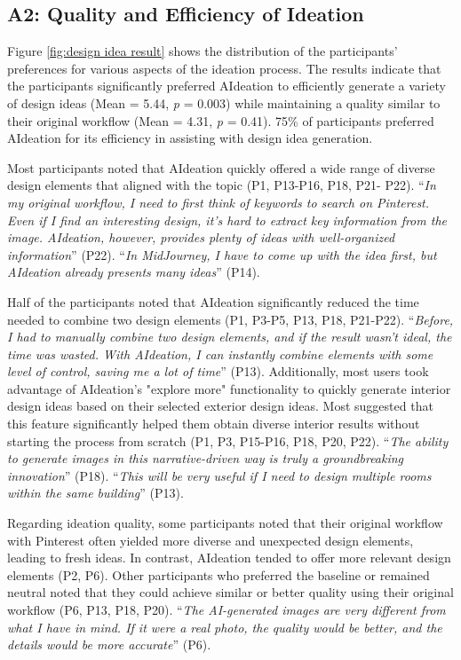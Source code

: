 \subsection{A2: Quality and Efficiency of Ideation}
Figure \ref{fig:design idea result} shows the distribution of the participants' preferences for various aspects of the ideation process. The results indicate that the participants significantly preferred AIdeation to efficiently generate a variety of design ideas (Mean = 5.44, \textit{p} = 0.003) while maintaining a quality similar to their original workflow (Mean = 4.31, \textit{p} = 0.41). 75\% of participants preferred AIdeation for its efficiency in assisting with design idea generation. 

Most participants noted that AIdeation quickly offered a wide range of diverse design elements that aligned with the topic (P1, P13-P16, P18, P21- P22). “\textit{In my original workflow, I need to first think of keywords to search on Pinterest. Even if I find an interesting design, it's hard to extract key information from the image. AIdeation, however, provides plenty of ideas with well-organized information}” (P22). “\textit{In MidJourney, I have to come up with the idea first, but AIdeation already presents many ideas}” (P14).

Half of the participants noted that AIdeation significantly reduced the time needed to combine two design elements (P1, P3-P5, P13, P18, P21-P22). “\textit{Before, I had to manually combine two design elements, and if the result wasn’t ideal, the time was wasted. With AIdeation, I can instantly combine elements with some level of control, saving me a lot of time}” (P13).
Additionally, most users took advantage of AIdeation's "explore more" functionality to quickly generate interior design ideas based on their selected exterior design ideas. Most suggested that this feature significantly helped them obtain diverse interior results without starting the process from scratch (P1, P3, P15-P16, P18, P20, P22). “\textit{The ability to generate images in this narrative-driven way is truly a groundbreaking innovation}” (P18).  “\textit{This will be very useful if I need to design multiple rooms within the same building}” (P13).

Regarding ideation quality, some participants noted that their original workflow with Pinterest often yielded more diverse and unexpected design elements, leading to fresh ideas. In contrast, AIdeation tended to offer more relevant design elements (P2, P6). Other participants who preferred the baseline or remained neutral noted that they could achieve similar or better quality using their original workflow (P6, P13, P18, P20). “\textit{The AI-generated images are very different from what I have in mind. If it were a real photo, the quality would be better, and the details would be more accurate}” (P6).

